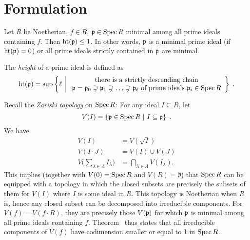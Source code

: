 \documentclass[a4paper,parskip=full,numbers=enddot]{scrreprt}
\begin{document}
\section{Formulation}
\setcounter{thm}{10}
\begin{thm}
    Let $R$ be Noetherian, $f\in R$, $\mathfrak{p}\in \operatorname{Spec} R$ minimal among all prime ideals containing $f$. Then $\operatorname{ht}(\mathfrak{p}) \leq 1$. In other words, $\mathfrak{p}$ is a minimal prime ideal (if $\operatorname{ht}(\mathfrak{p}) =0$) or all prime ideals strictly contained in $\mathfrak{p}$ are minimal.
\end{thm}
\begin{rem*}
    \begin{alphanumerate}
    \item
        The \emph{height} of a prime ideal is defined as
        \begin{align*}
            \operatorname{ht}(\mathfrak{p}) = \sup\left\{\ell\ \middle|\ 
            \begin{array}{c}
	            \text{there is a strictly descending chain}\\
	            \mathfrak{p}=\mathfrak{p}_0\supsetneq\mathfrak{p}_1\supsetneq\ldots\supsetneq\mathfrak{p}_\ell\text{ of prime ideals }\mathfrak{p}_i\in\operatorname{Spec} R
            \end{array}\right\}\;.
        \end{align*}
    \item
        Recall the \emph{Zariski topology} on $\operatorname{Spec} R$: For any ideal $I\subseteq R$, let 
        \begin{align*}
        	V(I) = \left\{\mathfrak{p}\in\operatorname{Spec} R\ \middle|\  I\subseteq \mathfrak{p}\right\}\;.
        \end{align*}
        We have
        \begin{align*}
            V(I)& = V\left(\sqrt{I}\right)\\
            V(I\cdot J ) &= V(I) \cup V(J)\\
            V\bigg(\sum_{\lambda\in\Lambda} I_\lambda\bigg) &= \bigcap_{\lambda\in\Lambda} V(I_\lambda).
        \end{align*}
        This implies (together with $V(0) = \operatorname{Spec} R$ and $V(R) = \emptyset$) that $\operatorname{Spec} R$ can be equipped with a topology in which the closed subsets are precisely the subsets of them for $V(I)$ where $I$ is some ideal in $R$. This topology is Noetherian when $R$ is, hence any closed subset can be decomposed into irreducible components. For $V(f) = V(f\cdot R)$, they are precisely those $V(\mathfrak{p})$ for which $\mathfrak{p}$ is minimal among all prime ideals containing $f$. Theorem~ thus states that all irreducible components of $V(f)$ have codimension smaller or equal to 1 in $\operatorname{Spec} R$.
    \end{alphanumerate}
\end{rem*}

\printbibliography
\end{document}
